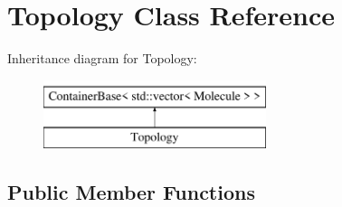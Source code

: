 \hypertarget{classTopology}{}\section{Topology Class Reference}
\label{classTopology}
Inheritance diagram for Topology\+:\begin{figure}[H]
\begin{center}
\leavevmode
\includegraphics[height=2.000000cm]{classTopology}
\end{center}
\end{figure}
\subsection*{Public Member Functions}
